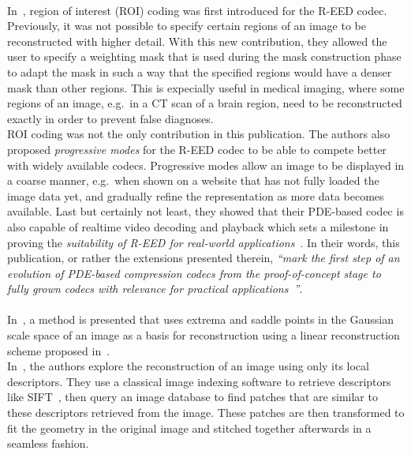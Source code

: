 \\
In~\cite{peter15}, region of interest (ROI) coding was first introduced for the R-EED codec. Previously,
it was not possible to specify certain regions of an image to be reconstructed with higher detail.
With this new contribution, they allowed the user to specify a weighting mask that is used during
the mask construction phase to adapt the mask in such a way that the specified regions would have a
denser mask than other regions. This is expecially useful in medical imaging, where some regions of
an image, e.g.\ in a CT scan of a brain region, need to be reconstructed exactly in order to prevent
false diagnoses. \\
ROI coding was not the only contribution in this publication. The authors also proposed
\textit{progressive modes} for the R-EED codec to be able to compete better with widely available codecs.
Progressive modes allow an image to be displayed in a coarse manner, e.g.\ when shown on a website
that has not fully loaded the image data yet, and gradually refine the representation as more data
becomes available. Last but certainly not least, they showed that their PDE-based codec is also
capable of realtime video decoding and playback which sets a milestone in proving the
\textit{suitability of R-EED for real-world applications}~\cite{peter15}. In their words, this
publication, or rather the extensions presented therein, \textit{\enquote{mark the first step of an evolution of
    PDE-based compression codecs from the proof-of-concept stage to fully grown codecs with relevance
for practical applications~\cite{peter15}}}.\\
\\
In~\cite{kanters05}, a method is presented that uses extrema and saddle points in the Gaussian
scale space of an image as a basis for reconstruction using a linear reconstruction scheme proposed
in~\cite{janssen05}.\\
In~\cite{weinzaepfel11}, the authors explore the reconstruction of an image using only its local
descriptors. They use a classical image indexing software to retrieve descriptors like
SIFT~\cite{sift}, then query an image database to find patches that are similar to these descriptors
retrieved from the image. These patches are then transformed to fit the geometry in the original
image and stitched together afterwards in a seamless fashion.


